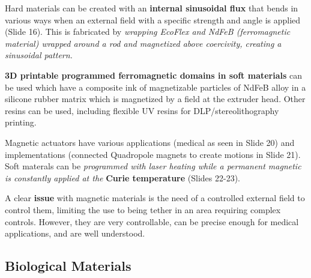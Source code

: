 \documentclass[onecolumn,a4paper]{article}
\begin{document}
Hard materials can be created with an \textbf{internal sinusoidal flux} that bends in various ways when an external field with a specific strength and angle is applied (Slide 16). This is fabricated by \emph{wrapping EcoFlex and NdFeB (ferromagnetic material) wrapped around a rod and magnetized above coercivity, creating a sinusoidal pattern.}

\textbf{3D printable programmed ferromagnetic domains in soft materials} can be used which have a composite ink of magnetizable particles of NdFeB alloy in a silicone rubber matrix which is magnetized by a field at the extruder head. Other resins can be used, including flexible UV resins for DLP/stereolithography printing.

Magnetic actuators have various applications (medical as seen in Slide 20) and implementations (connected Quadropole magnets to create motions in Slide 21). Soft materals can be \emph{programmed with laser heating while a permanent magnetic is constantly applied at the} \textbf{Curie temperature} (Slides 22-23).

A clear \textbf{issue} with magnetic materials is the need of a controlled external field to control them, limiting the use to being tether in an area requiring complex controls. However, they are very controllable, can be precise enough for medical applications, and are well understood.


\subsection{Biological Materials}
\label{subsec::biom}
\end{document}

